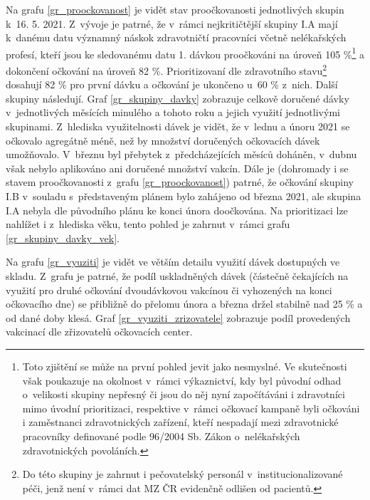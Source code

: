 Na grafu \ref{gr_proockovanost} je vidět stav proočkovanosti jednotlivých skupin k~16. 5. 2021. Z~vývoje je patrné, že v~rámci nejkritičtější skupiny I.A mají k~danému datu vý\-znam\-ný náskok zdravotničtí pracovníci včetně nelékařských profesí, kteří jsou ke sledovanému datu 1. dávkou proočkováni na úroveň 105 \%\footnote{Toto zjištění se může na první pohled jevit jako nesmyslné. Ve skutečnosti však poukazuje na okolnost v~rámci výkaznictví, kdy byl původní odhad o~velikosti skupiny nepřesný či jsou do něj nyní započítáváni i zdravotníci mimo úvodní prioritizaci, respektive v~rámci očkovací kampaně byli očkováni i zaměstnanci zdravotnických zařízení, kteří nespadají mezi zdravotnické pracovníky definované podle 96/2004 Sb. Zákon o~nelékařských zdravotnických povoláních.} a dokončení očkování na úroveň 82 \%. Prioritizovaní dle zdravotního stavu\footnote{Do této skupiny je zahrnut i pečovatelský personál v~institucionalizované péči, jenž není v~rámci dat MZ ČR evidenčně odlišen od pacientů.} dosahují 82 \% pro první dávku a očkování je ukončeno u~60 \% z~nich. Další skupiny následují. 
%
Graf \ref{gr_skupiny_davky} zobrazuje celkově doručené dávky v~jednotlivých měsících minulého a tohoto roku a jejich využití jednotlivými skupinami. Z~hlediska využitelnosti dávek je vidět, že v~lednu a únoru 2021 se očkovalo agregátně méně, než by množství doručených očkovacích dávek umožňovalo. V~březnu byl přebytek z~předcházejících měsíců doháněn, v~dubnu však nebylo aplikováno ani doručené množství vakcín. Dále je (dohromady i se stavem proočkovanosti z~grafu \ref{gr_proockovanost}) patrné, že očkování skupiny I.B v~souladu s~představeným plánem bylo zahájeno od března 2021, ale skupina I.A nebyla dle původního plánu ke konci února doočkována.
%
Na prioritizaci lze nahlížet i z~hlediska věku, tento pohled je zahrnut v~rámci grafu \ref{gr_skupiny_davky_vek}.


Na grafu \ref{gr_vyuziti} je vidět ve větším detailu využití dávek dostupných ve skladu. Z~grafu je patrné, že podíl uskladněných dávek (částečně čekajících na využití pro druhé očkování dvoudávkovou vakcínou či vyhozených na konci očkovacího dne) se přibližně do přelomu února a března držel stabilně nad 25 \% a od dané doby klesá.
%
Graf \ref{gr_vyuziti_zrizovatele} zobrazuje podíl provedených vakcinací dle zřizovatelů očkovacích center.





